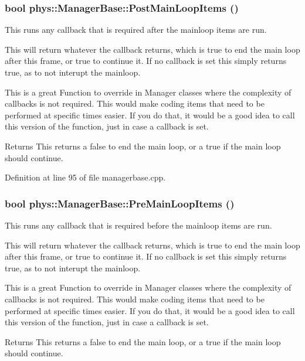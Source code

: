 \hypertarget{classphys_1_1ManagerBase_afc3572602f96bdeb8215c386ff870820}{
\subsubsection[{PostMainLoopItems}]{\setlength{\rightskip}{0pt plus 5cm}bool phys::ManagerBase::PostMainLoopItems ()}}
\label{d2/de3/classphys_1_1ManagerBase_afc3572602f96bdeb8215c386ff870820}


This runs any callback that is required after the mainloop items are run. 

This will return whatever the callback returns, which is true to end the main loop after this frame, or true to continue it. If no callback is set this simply returns true, as to not interupt the mainloop. \par
 This is a great Function to override in Manager classes where the complexity of callbacks is not required. This would make coding items that need to be performed at specific times easier. If you do that, it would be a good idea to call this version of the function, just in case a callback is set. \begin{DoxyReturn}{Returns}
This returns a false to end the main loop, or a true if the main loop should continue. 
\end{DoxyReturn}


Definition at line 95 of file managerbase.cpp.

\hypertarget{classphys_1_1ManagerBase_af6210834a8af592481cf6aefa9916d88}{
\subsubsection[{PreMainLoopItems}]{\setlength{\rightskip}{0pt plus 5cm}bool phys::ManagerBase::PreMainLoopItems ()}}
\label{d2/de3/classphys_1_1ManagerBase_af6210834a8af592481cf6aefa9916d88}


This runs any callback that is required before the mainloop items are run. 

This will return whatever the callback returns, which is true to end the main loop after this frame, or true to continue it. If no callback is set this simply returns true, as to not interupt the mainloop. \par
 This is a great Function to override in Manager classes where the complexity of callbacks is not required. This would make coding items that need to be performed at specific times easier. If you do that, it would be a good idea to call this version of the function, just in case a callback is set. \begin{DoxyReturn}{Returns}
This returns a false to end the main loop, or a true if the main loop should continue. 
\end{DoxyReturn}


